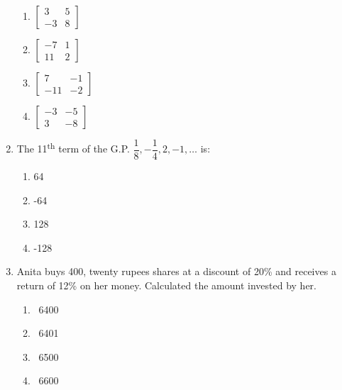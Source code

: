 \begin{enumerate}[label=(\roman*)]
        \begin{multicols}{2}
        \begin{enumerate}[label=(\alph*)]
            \item $\begin{bmatrix*} 3 & 5 \\ -3 & 8 \end{bmatrix*}$
            \item $\begin{bmatrix*} -7 & 1 \\ 11 & 2  \end{bmatrix*}$
            \item $\begin{bmatrix*} 7 & -1 \\ -11 & -2 \end{bmatrix*}$
            \item $\begin{bmatrix*} -3 & -5 \\ 3 & -8 \end{bmatrix*}$
        \end{enumerate}
        \end{multicols}

    \newpage
    \item The 11\textsuperscript{th} term of the G.P. 
        $\dfrac18, -\dfrac14, 2, -1, \dots$ is:

        \begin{multicols}{2}
        \begin{enumerate}[label=(\alph*)]
            \item 64
            \item -64
            \item 128
            \item -128
        \end{enumerate}
        \end{multicols}

    \item Anita buys 400, twenty rupees shares at a discount of 20\% and 
        receives a return of 12\% on her money. Calculated the amount invested
        by her.

        \begin{multicols}{2}
        \begin{enumerate}[label=(\alph*)]
            \item \rupee~6400
            \item \rupee~6401
            \item \rupee~6500
            \item \rupee~6600
        \end{enumerate}
        \end{multicols}

\end{enumerate}


